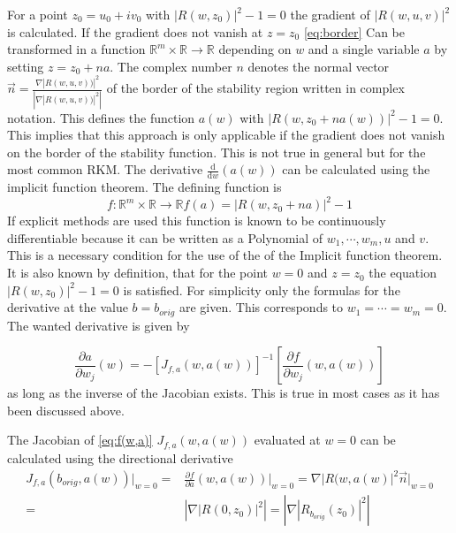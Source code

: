 \documentclass[a4paper]{scrartcl}
\numberwithin{equation}{section}
\theoremstyle{plain}
\theoremstyle{definition}
\numberwithin{theorem}{section}
\newcommand{\R}{\mathbb{R}}
\newcommand{\1}{\mathbbm{1}}
\begin{document}
For a point $z_0= u_0 +i v_0 $ 
with $ |R(w,z_0)|^2 -1 = 0 $ the gradient of
 $|R(w,u,v)|^2$ is calculated. 
If the gradient does not vanish at $z = z_0$ \eqref{eq:border} Can be transformed in a function $\R^m \times \R \rightarrow \R$ depending on $w$ and a single variable $a$ by setting $z = z_0 + n a$. The complex number $n$ denotes the normal vector $\vec{n} = \frac{\nabla |R(w,u,v))|^2}{\left| \nabla |R(w,u,v))|^2 \right|}$ of the border of the stability region written in complex notation. This defines the function $a(w)$ with $|R(w,z_0 + n a(w))|^2 -1 = 0$. 
This implies that this approach is only applicable if the gradient does not vanish on the border of the stability function. This is not true in general but for the most common RKM.
The derivative $\frac{\mathrm d}{\mathrm d w} (a(w))$ can be calculated using the implicit function theorem. The defining function is 
\begin{equation}\label{eq:f(w,a)}
f: \R^m \times \R \rightarrow \R f(a) = |R(w,z_0 + n a)|^2 -1 
\end{equation}
If explicit methods are used this function is known to be continuously differentiable because it can be written as a Polynomial of $w_1,\cdots,w_m,u$ and $v$. This is a necessary condition for the use of the of the Implicit function theorem. 
It is also known by definition, that for the point $w=0$ and $z = z_0$ the equation $ |R(w,z_0)|^2 -1 = 0 $ is satisfied.
For simplicity only the formulas for the derivative at the value $b = b_{orig}$ are given. This corresponds to $w_1 = \cdots = w_m = 0$.
The wanted derivative  is given by 

\begin{equation}
 \frac{\partial a}{\partial w_j} (w) =
 - \left[ J_{f,a}(w,a(w))  \right] ^{-1} 
   \left[ \frac{\partial f}{\partial w_j}(w,a(w)) \right]
\end{equation}
as long as the inverse of the Jacobian exists. This is true in most cases as it has been discussed above.

The Jacobian of \eqref{eq:f(w,a)} $J_{f,a}(w,a(w))$ evaluated at $w=0$ can be calculated using the directional derivative
\begin{align*}
 J_{f,a}(b_{orig},a(w)) \Big|_{w=0} =& 
 \frac{\partial f}{\partial a} (w,a(w)) \Big|_{w=0} = 
 \nabla |R(w,a(w)|^2 \vec{n} \Big|_{w=0} \\
=& \left| \nabla|R(0,z_0)|^2 \right| = \left| \nabla|R_{b_{orig}}(z_0)|^2 \right|
\end{align*} 
\end{document}
